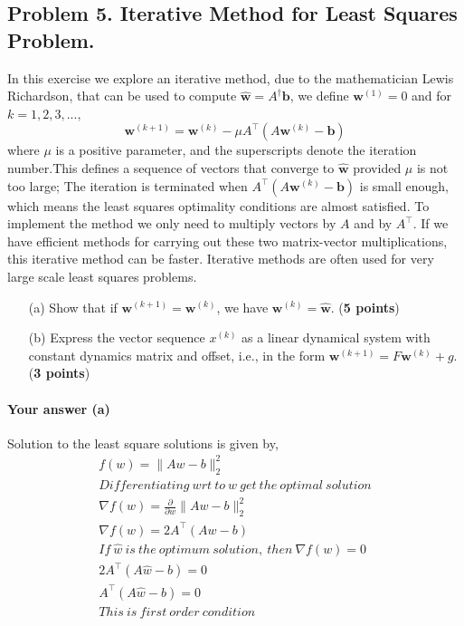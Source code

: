 \documentclass[11pt]{scrartcl}
\newcommand{\bw}{\mathbf{w}}
\newcommand{\bb}{\mathbf{b}}
\begin{document}
	
	\subsection*{Problem 5. Iterative Method for Least Squares Problem.}
	
	In this exercise we explore an iterative method, due to the mathematician Lewis Richardson, that can be used to compute $\hat{\bw} = A^\dagger \bb$, we define $\bw^{(1)} = 0$ and for $k = 1, 2, 3, ...,$
	$$
	\bw^{(k+1)} = \bw^{(k)} - \mu A^\intercal (A\bw^{(k)} - \bb)
	$$
	where $\mu$ is a positive parameter, and the superscripts denote the iteration number.This defines a sequence of vectors that converge to $\hat{\bw}$ provided $\mu$ is not too large; The iteration is terminated when $A^\intercal (A \bw^{(k)} - \bb)$ is small enough, which means the least squares optimality conditions are almost satisfied. To implement the method we only need to multiply vectors by $A$ and by $A^\intercal$. If we have efficient methods for carrying out these two matrix-vector multiplications, this iterative
	method can be faster. Iterative methods are often used for very large scale least squares problems.
	\begin{itemize}
		\item [(a)] Show that if $\bw ^{(k+1)} = \bw ^{(k)}$, we have $\bw^{(k)} = \hat{\bw}$.  (\textbf{5 points})
		\item [(b)] Express the vector sequence $x^{(k)}$ as a linear dynamical system with constant dynamics matrix and offset, i.e., in the form $\bw^{(k+1)} = F\bw^{(k)} + g$.  (\textbf{3 points})
	\end{itemize}
	
	\paragraph{Your answer (a)}
	Solution to the least square solutions is given by,
	\begin{gather*}
	f(w) = \|Aw - b\|_2^2\\
	Differentiating\ wrt\ to\ w\ get\ the\ optimal\ solution\\
	\nabla f(w) = \frac{\partial }{\partial w}\|Aw - b\|_2^2\\
	\nabla f(w) = 2A^\intercal (Aw-b)\\
	If\ \hat{w}\ is\ the\ optimum\ solution,\ then\ \nabla f(w) = 0\\
	2A^\intercal (A\hat{w}-b) = 0\\
	A^\intercal (A\hat{w}-b) = 0\\
	This\ is\ first\ order\ condition
	\end{gather*}
	
\end{document}
